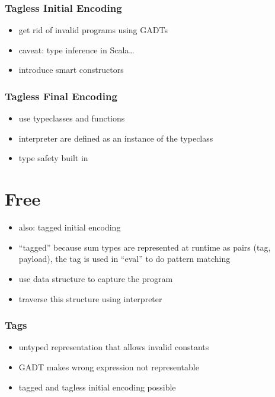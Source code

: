 \documentclass[aspectratio=169]{beamer}
\begin{document}
\begin{frame}
  \frametitle{Tagless Initial Encoding}
  \begin{itemize}
  \item get rid of invalid programs using GADTs
  \item caveat: type inference in Scala\ldots{}
  \item introduce smart constructors
  \end{itemize}
\end{frame}

\begin{frame}
  \frametitle{Tagless Final Encoding}
  \begin{itemize}
  \item use typeclasses and functions
  \item interpreter are defined as an instance of the typeclass
  \item type safety built in
  \end{itemize}
\end{frame}

\section{Free}\label{sec:free}

\begin{frame}
  \begin{itemize}
  \item also: tagged initial encoding
  \item ``tagged'' because sum types are represented at runtime as
    pairs (tag, payload), the tag is used in ``eval'' to do pattern
    matching
  \item use data structure to capture the program
  \item traverse this structure using interpreter
  \end{itemize}
\end{frame}

\begin{frame}
  \frametitle{Tags}
  \begin{itemize}
  \item untyped representation that allows invalid constants
  \item GADT makes wrong expression not representable
  \item tagged and tagless initial encoding possible
  \end{itemize}
\end{frame}
\end{document}
